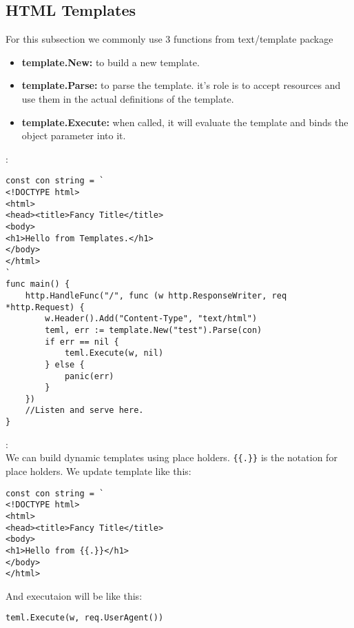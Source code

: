 \subsection{HTML Templates}
For this subsection we commonly use 3 functions from text/template package
\begin{itemize}
	\item \textbf{template.New:} to build a new template.
	\item \textbf{template.Parse:} to parse the template. it's role is to accept resources and use them in the actual definitions of the template.
	\item \textbf{template.Execute:} when called, it will evaluate the template and binds the object parameter into it.
\end{itemize}
\begin{note}:
\begin{lstlisting}[language=Golang]
const con string = `
<!DOCTYPE html>
<html>
<head><title>Fancy Title</title>
<body>
<h1>Hello from Templates.</h1>
</body>
</html>
`
func main() {	
	http.HandleFunc("/", func (w http.ResponseWriter, req *http.Request) {
		w.Header().Add("Content-Type", "text/html")
		teml, err := template.New("test").Parse(con)
		if err == nil {
			teml.Execute(w, nil)
		} else {
			panic(err)
		}
	})
	//Listen and serve here.
}
\end{lstlisting}
\end{note}
\begin{note}:\\
We can build dynamic templates using place holders. \verb|{{.}}| is the notation for place holders. We update template like this:
\begin{lstlisting}[language=Golang]
const con string = `
<!DOCTYPE html>
<html>
<head><title>Fancy Title</title>
<body>
<h1>Hello from {{.}}</h1>
</body>
</html>
\end{lstlisting}
And executaion will be like this:
\begin{lstlisting}[language=Golang]
teml.Execute(w, req.UserAgent())
\end{lstlisting}
\end{note}
